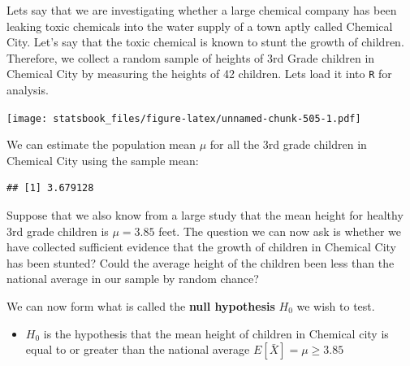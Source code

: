\documentclass[
]{book}
\newenvironment{Shaded}{\begin{snugshade}}{\end{snugshade}}
\newcommand{\AttributeTok}[1]{\textcolor[rgb]{0.77,0.63,0.00}{#1}}
\newcommand{\FunctionTok}[1]{\textcolor[rgb]{0.00,0.00,0.00}{#1}}
\newcommand{\NormalTok}[1]{#1}
\newcommand{\SpecialCharTok}[1]{\textcolor[rgb]{0.00,0.00,0.00}{#1}}
\newcommand{\StringTok}[1]{\textcolor[rgb]{0.31,0.60,0.02}{#1}}
\providecommand{\tightlist}{%
  \setlength{\itemsep}{0pt}\setlength{\parskip}{0pt}}
\theoremstyle{definition}
\theoremstyle{definition}
\theoremstyle{definition}
\theoremstyle{definition}
\theoremstyle{remark}
\begin{document}
Lets say that we are investigating whether a large chemical company has been leaking toxic chemicals into the water supply of a town aptly called Chemical City. Let's say that the toxic chemical is known to stunt the growth of children. Therefore, we collect a random sample of heights of 3rd Grade children in Chemical City by measuring the heights of 42 children. Lets load it into \texttt{R} for analysis.

\begin{Shaded}
\end{Shaded}

\texttt{[image: statsbook\_files/figure-latex/unnamed-chunk-505-1.pdf]}

We can estimate the population mean \(\mu\) for all the 3rd grade children in Chemical City using the sample mean:

\begin{Shaded}
\end{Shaded}

\begin{verbatim}
## [1] 3.679128
\end{verbatim}

Suppose that we also know from a large study that the mean height for healthy 3rd grade children is \(\mu=3.85\) feet. The question we can now ask is whether we have collected sufficient evidence that the growth of children in Chemical City has been stunted? Could the average height of the children been less than the national average in our sample by random chance?

We can now form what is called the \textbf{null hypothesis} \(H_0\) we wish to test.

\begin{itemize}
\tightlist
\item
  \(H_0\) is the hypothesis that the mean height of children in Chemical city is equal to or greater than the national average \(E[\bar{X}]=\mu \geq 3.85\)
\end{itemize}
\end{document}
